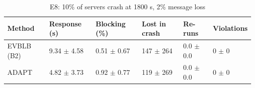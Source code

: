 \begin{table}[t]
\centering
\footnotesize
\caption{E8: 10\% of servers crash at 1800 s, 2\% message loss}
\label{tab:e8}
\begin{tabular}{llllll}
\toprule
Method & Response (s) & Blocking (\%) & Lost in crash & Re-runs & Violations \\
\midrule
EVBLB (B2) & 9.34 $\pm$ 4.58 & 0.51 $\pm$ 0.67 & 147 $\pm$ 264 & 0.0 $\pm$ 0.0 & 0 $\pm$ 0 \\
ADAPT & 4.82 $\pm$ 3.73 & 0.92 $\pm$ 0.77 & 119 $\pm$ 269 & 0.0 $\pm$ 0.0 & 0 $\pm$ 0 \\
\bottomrule
\end{tabular}
\end{table}
